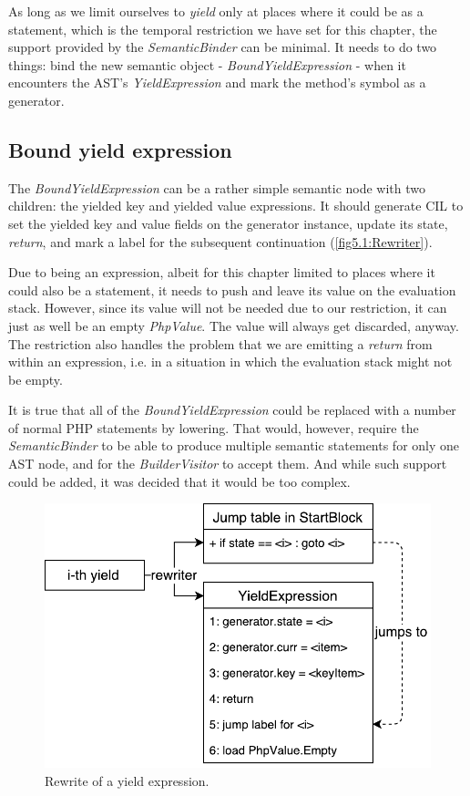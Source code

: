 As long as we limit ourselves to \emph{yield} only at places where it could be as a statement, which is the temporal restriction we have set for this chapter, the support provided by the \emph{SemanticBinder} can be minimal. It needs to do two things: bind the new semantic object - \emph{BoundYieldExpression} - when it encounters the AST’s \emph{YieldExpression} and mark the method’s symbol as a generator. 

\subsection{Bound yield expression}

The \emph{BoundYieldExpression} can be a rather simple semantic node with two children: the yielded key and yielded value expressions. It should generate CIL to set the yielded key and value fields on the generator instance, update its state, \emph{return}, and mark a label for the subsequent continuation (\autoref{fig5.1:Rewriter}). 

Due to being an expression, albeit for this chapter limited to places where it could also be a statement, it needs to push and leave its value on the evaluation stack. However, since its value will not be needed due to our restriction, it can just as well be an empty \emph{PhpValue}. The value will always get discarded, anyway. The restriction also handles the problem that we are emitting a \emph{return} from within an expression, i.e. in a situation in which the evaluation stack might not be empty.

It is true that all of the \emph{BoundYieldExpression} could be replaced with a number of normal PHP statements by lowering. That would, however, require the \emph{SemanticBinder} to be able to produce multiple semantic statements for only one AST node, and for the \emph{BuilderVisitor} to accept them. And while such support could be added, it was decided that it would be too complex.

\begin{figure}[h]
	\centering	
	\includegraphics[scale=0.75]{../img/5_1_rewriter}	
	\caption{Rewrite of a yield expression.}
	\label{fig5.1:Rewriter}
\end{figure}


